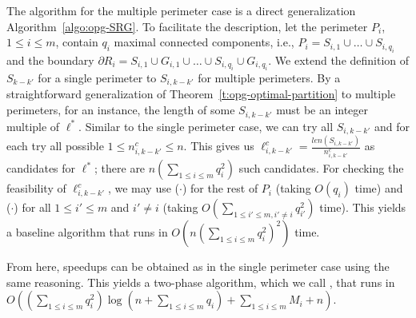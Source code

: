 The algorithm for the multiple perimeter case is a direct 
generalization Algorithm~\ref{algo:opg-SRG}. To facilitate the description, 
let the perimeter $P_i$, $1 \le i \le m$, contain $q_i$ maximal connected 
components, i.e., $P_i = S_{i,1} \cup\ldots \cup S_{i,q_i}$ and the 
boundary $\partial R_i = S_{i,1} \cup G_{i,1} \cup \ldots \cup S_{i,q_i} 
\cup G_{i,q_i}$. We extend the definition of $S_{k-k'}$ for a single 
perimeter to $S_{i,k-k'}$ for multiple perimeters. By a straightforward 
generalization of Theorem~\ref{t:opg-optimal-partition} to multiple perimeters,
for an \opg instance, the length of some $S_{i,k-k'}$ must be an integer 
multiple of $\ell^*$. Similar to the single perimeter case, we can try 
all $S_{i,k-k'}$ and for each try all possible $1 \le n_{i,k-k'}^c \le n$. 
This gives us $\ell_{i,k-k'}^c = \frac{len(S_{i,k-k'})}{n_{i,k-k'}^c}$ as 
candidates for $\ell^*$; there are $n(\sum_{1\le i \le m} q_i^2)$ such 
candidates. For checking the feasibility of $\ell_{i,k-k'}^c$, we may use 
\isLFeasibleByTilingPartial($\cdot$) for the rest of $P_i$ (taking $O(q_i)$ 
time) and \isLFeasibleByTilingFull($\cdot$) for all $1 \le i' \le m$ and $i' 
\ne i$ (taking $O(\sum_{1 \le i' \le m, i' \ne i} q_{i'}^2)$ time). 
This yields a baseline algorithm that runs in 
$O(n(\sum_{1\le i \le m} q_i^2)^2)$ time. 

From here, speedups can be obtained as in the single perimeter case using 
the same reasoning. This yields a two-phase algorithm, which we call 
\algoMRG, that runs in $O((\sum_{1\le i \le m} q_i^2) \log(n + 
\sum_{1\le i \le m} q_i) + \sum_{1\le i \le m} M_i + n)$. 

